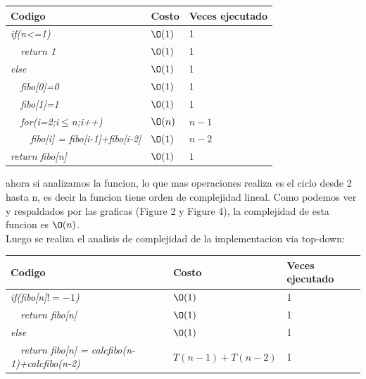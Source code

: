 \documentclass[spanish]{article}
\begin{document}
	\begin{center}
		\begin{table}[H]
			\begin{tabular}{|l|l|l|}
				\hline
				\rowcolor[HTML]{FFCC67} 
				Codigo                           & Costo & Veces ejecutado \\ \hline
				\textit{if(n<=1)}                    & $\O(1)$    & 1               \\ \hline
				\textit{\  \  return 1}                    & $\O(1)$    & 1               \\ \hline
				\textit{else}                    & $\O(1)$    & 1               \\ \hline
				\textit{\  \  fibo[0]=0}                    & $\O(1)$    & 1               \\ \hline
				\textit{\  \  fibo[1]=1}                    & $\O(1)$    & 1               \\ \hline				
				\textit{\  \  for(i=2;i$\leq$n;i++)} & $\O(n)$    & $n-1$             \\ \hline
				\textit{\  \  \  \  fibo[i] = fibo[i-1]+fibo[i-2]}                 & $\O(1)$    & $n-2$               \\ \hline
				\textit{return fibo[n]} & $\O(1)$    & $1$             \\ \hline				
			\end{tabular}
		\end{table}										
	\end{center}
	ahora si analizamos la funcion, lo que mas operaciones realiza es el ciclo desde 2 hasta n, es decir la funcion tiene orden de complejidad lineal.
	Como podemos ver y respaldados por las graficas (Figure 2 y Figure 4), la complejidad de esta funcion es $\O(n)$.\\
	Luego se realiza el analisis de complejidad de la implementacion via top-down:\\
	\begin{center}
		\begin{table}[H]
			\begin{tabular}{|l|l|l|}
				\hline
				\rowcolor[HTML]{FFCC67} 
				Codigo                           & Costo & Veces ejecutado \\ \hline
				\textit{if(fibo[n]$!=-1$)}                    & $\O(1)$    & 1               \\ \hline
				\textit{\  \  return fibo[n]}                    & $\O(1)$    & 1               \\ \hline
				\textit{else}                    & $\O(1)$    & 1               \\ \hline
				\textit{\  \  return fibo[n] = calcfibo(n-1)+calcfibo(n-2)}                    & $T(n-1)+T(n-2)$    & 1               \\ \hline 				
			\end{tabular}
		\end{table}										
	\end{center}
\end{document}
